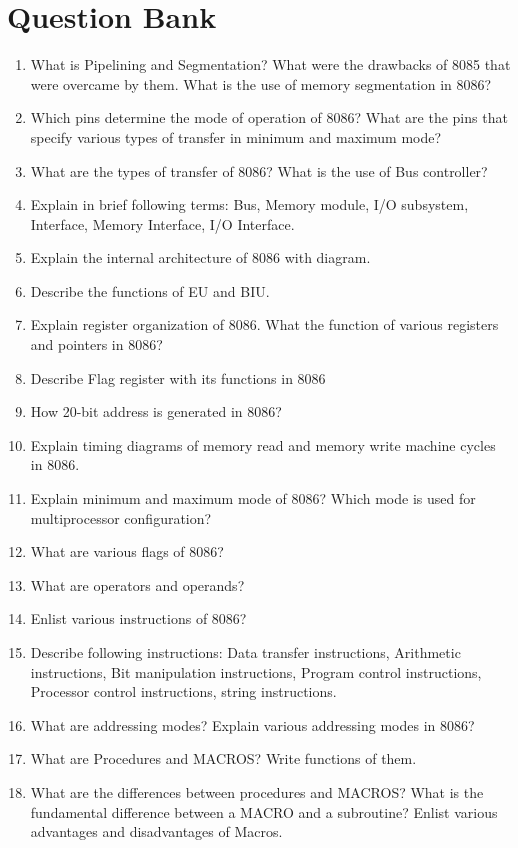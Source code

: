 \documentclass[12pt, a4paper]{scrartcl}
\begin{document}
\section{Question Bank}
	\begin{enumerate}
		\item What is Pipelining and Segmentation? What were the drawbacks of 8085 that were overcame by them. What is the use of memory segmentation in 8086?
		\item Which pins determine the mode of operation of 8086? What are the pins that specify various types of transfer in minimum and maximum mode?
		\item What are the types of transfer of 8086? What is the use of Bus controller?
		\item Explain in brief following terms: Bus, Memory module, I/O subsystem, Interface, Memory Interface, I/O Interface.
		\item Explain the internal architecture of 8086 with diagram.
		\item Describe the functions of EU and BIU.
		\item Explain register organization of 8086. What the function of various registers and pointers in 8086?
		\item Describe Flag register with its functions in 8086
		\item How 20-bit address is generated in 8086?
		\item Explain timing diagrams of memory read and memory write machine cycles in 8086.
		\item Explain minimum and maximum mode of 8086? Which mode is used for multiprocessor configuration?
		\item What are various flags of 8086?
		\item What are operators and operands? 
		\item Enlist various instructions of 8086?
		\item Describe following instructions: Data transfer instructions, Arithmetic instructions, Bit manipulation instructions, Program control instructions, Processor control instructions, string instructions.
		\item What are addressing modes? Explain various addressing modes in 8086?
		\item What are Procedures and MACROS? Write functions of them. 
		\item What are the differences between procedures and MACROS? What is the fundamental difference between a MACRO and a subroutine? Enlist various advantages and disadvantages of Macros.

\end{enumerate}
\end{document}
